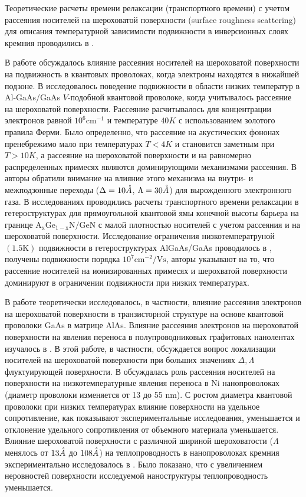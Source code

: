 Теоретические расчеты времени релаксации (транспортного времени) с учетом рассеяния носителей на шероховатой поверхности (surface roughness scattering) для описания температурной зависимости подвижности в инверсионных слоях кремния проводились в \cite{Stern1980,Masaki1989}.

В работе \cite{Motohisa1992} обсуждалось влияние рассеяния носителей на шероховатой поверхности на подвижность в квантовых проволоках, когда электроны находятся в нижайшей подзоне. В \cite{Tsetseri2004,Tsetseri2008} исследовалось поведение подвижности в области низких температур в Al-GaAs/GaAs $V$-подобной квантовой проволоке, когда учитывалось рассеяние на шероховатой поверхности. Рассеяние расчитывалось для концентрации электронов равной $10^6 \mathrm{cm^{−1}}$ и температуре $40 K$ с использованием золотого правила Ферми. Было определенно, что рассеяние на акустических фононах пренебрежимо мало при температурах $T<4K$ и становится заметным при $T>10K$, а рассеяние на шероховатой поверхности и на равномерно распределенных примесях являются доминирующими механизмами рассеяния.
В \cite{Vurgaftman1997} авторы обратили внимание на влияние этого механизма на внутри- и межподзонные переходы ($\Delta =10\AA$, $\Lambda =30 \AA$) для вырожденного электронного газа. В исследованиях \cite{Quang2006} проводились расчеты транспортного времени релаксации в гетероструктурах для прямоугольной квантовой ямы конечной высоты барьера на границе $\mathrm{ A_x Ge_{1-x}N/GeN}$ с малой плотностью носителей с учетом рассеяния и на шероховатой поверхности.
Исследование ограничения низкотемператруной $(1.5 \mathrm{K})$ подвижности в гетероструктурах AlGaAs/GaAs проводилось в \cite{Saku1996,Saku1991}, получены подвижности порядка $10^7 \text{cm}^{-2} / \text{Vs}$, авторы указывают на то, что рассеяние носителей на ионизированных примесях и шерохватой поверхности доминируют в ограничении подвижности при низких температурах.

В работе \cite{Borzdov2007} теоретически исследовалось, в частности, влияние рассеяния электронов на шероховатой поверхности в транзисторной структуре на основе квантовой проволоки GaAs в матрице AlAs. Влияние рассеяния электронов на шероховатой поверхности на явления переноса в полупроводниковых графитовых нанолентах изучалось в \cite{Fang2008}. В этой работе, в частности, обсуждается вопрос локализации носителей на шероховатой поверхности при больших значениях $\Delta, \Lambda$ флуктуирующей поверхности. В \cite{Kamalakar2009} обсуждалась роль рассеяния носителей на поверхности на низкотемпературные явления переноса в Ni нанопроволоках (диаметр проволоки изменяется от 13 до 55 nm). С ростом диаметра квантовой проволоки при низких температурах влияние поверхности на удельное сопротивление, как показывают экспериментальные исследования, уменьшается и отклонение удельного сопротивления от объемного материала уменьшается. Влияние шероховатой поверхности с различной шириной шероховатости ($\Lambda $ менялось от $13 \AA$  до $108 \AA$) на теплопроводность в нанопроволоках кремния экспериментально исследовалось в \cite{Liu2010}. Было показано, что с увеличением неровностей поверхности исследуемой наноструктуры теплопроводность уменьшается.

